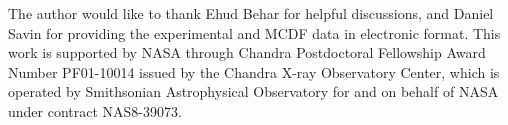 \documentclass[preprint, floatfix, pra, showpacs, showkeys]{revtex4}
\begin{document}
\begin{acknowledgments}
The author would like to thank Ehud Behar for helpful discussions, and
Daniel Savin for providing the experimental and MCDF data in electronic
format. This work is supported by
NASA through Chandra Postdoctoral Fellowship Award Number PF01-10014 issued by
the Chandra X-ray Observatory Center, which is operated by Smithsonian
Astrophysical Observatory for and on behalf of NASA under contract NAS8-39073.
\end{acknowledgments}



\end{document}

